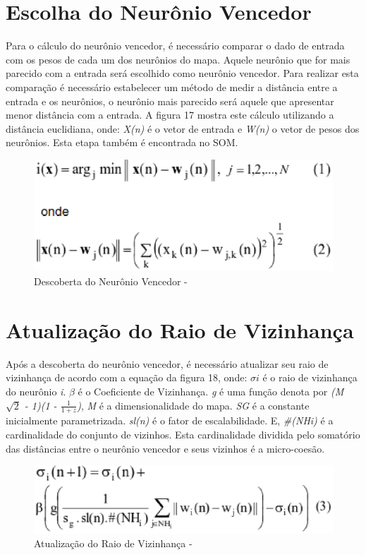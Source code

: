 \section{Escolha do Neurônio Vencedor}
Para o cálculo do neurônio vencedor, é necessário comparar o dado de entrada com os pesos de cada um dos neurônios do mapa. Aquele neurônio que for mais parecido com a entrada será escolhido como neurônio vencedor. Para realizar esta comparação é necessário estabelecer um método de medir a distância entre a entrada e os neurônios, o neurônio mais parecido será aquele que apresentar menor distância com a entrada. A figura 17 mostra este cálculo utilizando a distância euclidiana, onde: \textit{X(n)} é o vetor de entrada e \textit{W(n)} o vetor de pesos dos neurônios. Esta etapa também é encontrada no SOM.

\begin{figure}[!h]
\centering
\includegraphics[keepaspectratio=true,scale=0.50]
{figuras/vencedor.eps}
\caption{Descoberta do Neurônio Vencedor - }
\label{data_titatic}
\end{figure}

\section{Atualização do Raio de Vizinhança}
Após a descoberta do neurônio vencedor, é necessário atualizar seu raio de vizinhança de acordo com a equação da figura 18, onde: $\sigma i$ é o raio de vizinhança do neurônio \textit{i}. $\beta$ é o Coeficiente de Vizinhança. \textit{g} é uma função denota por \textit{(M $\sqrt{2}$ - 1)(1 - $\frac{1}{1 + z}$)}, \textit{M} é a dimensionalidade do mapa. \textit{SG} é a constante inicialmente parametrizada. \textit{sl(n)} é o fator de escalabilidade. E, \textit{\#(NHi)} é a cardinalidade do conjunto de vizinhos. Esta cardinalidade dividida pelo somatório das distâncias entre o neurônio vencedor e seus vizinhos é a micro-coesão. 

\begin{figure}[!h]
\centering
\includegraphics[keepaspectratio=true,scale=0.50]
{figuras/viz.eps}
\caption{Atualização do Raio de Vizinhança - }
\label{data_titatic}
\end{figure}

